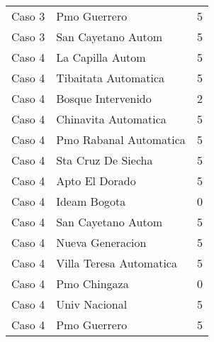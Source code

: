 \begin{longtable}{lll}
Caso 3 & Pmo Guerrero  & 5\\
Caso 3 & San Cayetano Autom   & 5\\
Caso 4 & La Capilla Autom  & 5\\
Caso 4 & Tibaitata Automatica  & 5\\
Caso 4 & Bosque Intervenido    & 2\\
Caso 4 & Chinavita Automatica  & 5\\
Caso 4 & Pmo Rabanal Automatica   & 5\\
Caso 4 & Sta Cruz De Siecha  & 5\\
Caso 4 & Apto El Dorado  & 5\\
Caso 4 & Ideam Bogota  & 0\\
Caso 4 & San Cayetano Autom   & 5\\
Caso 4 & Nueva Generacion  & 5\\
Caso 4 & Villa Teresa Automatica  & 5\\
Caso 4 & Pmo Chingaza  & 0\\
Caso 4 & Univ Nacional  & 5\\
Caso 4 & Pmo Guerrero  & 5\\


\end{longtable}






